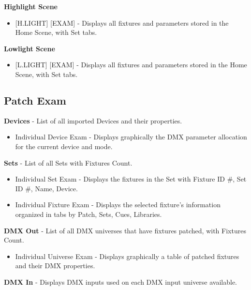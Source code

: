 \documentclass[
]{article}
\providecommand{\tightlist}{%
  \setlength{\itemsep}{0pt}\setlength{\parskip}{0pt}}
\begin{document}
\textbf{Highlight Scene}

\begin{itemize}
\tightlist
\item
  {[}H.LIGHT{]} {[}EXAM{]} - Displays all fixtures and parameters stored in the Home Scene, with Set tabs.
\end{itemize}

\textbf{Lowlight Scene}

\begin{itemize}
\tightlist
\item
  {[}L.LIGHT{]} {[}EXAM{]} - Displays all fixtures and parameters stored in the Home Scene, with Set tabs.
\end{itemize}

\hypertarget{Patch-Exam-16.3}{%
\subsection{Patch Exam}\label{Patch-Exam-16.3}}

\textbf{Devices} - List of all imported Devices and their properties.

\begin{itemize}
\tightlist
\item
  Individual Device Exam - Displays graphically the DMX parameter allocation for the current device and mode.
\end{itemize}

\textbf{Sets} - List of all Sets with Fixtures Count.

\begin{itemize}
\item
  Individual Set Exam - Displays the fixtures in the Set with Fixture ID \#, Set ID \#, Name, Device.
\item
  Individual Fixture Exam - Displays the selected fixture's information organized in tabs by Patch, Sets, Cues, Libraries.
\end{itemize}

\textbf{DMX Out} - List of all DMX universes that have fixtures patched, with Fixtures Count.

\begin{itemize}
\tightlist
\item
  Individual Universe Exam - Displays graphically a table of patched fixtures and their DMX properties.
\end{itemize}

\textbf{DMX In} - Displays DMX inputs used on each DMX input universe available.
\end{document}
